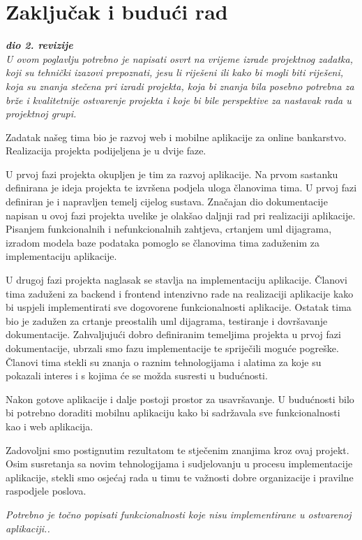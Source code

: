 \chapter{Zaključak i budući rad}
		
		\textbf{\textit{dio 2. revizije}}\\
		
		 \textit{U ovom poglavlju potrebno je napisati osvrt na vrijeme izrade projektnog zadatka, koji su tehnički izazovi prepoznati, jesu li riješeni ili kako bi mogli biti riješeni, koja su znanja stečena pri izradi projekta, koja bi znanja bila posebno potrebna za brže i kvalitetnije ostvarenje projekta i koje bi bile perspektive za nastavak rada u projektnoj grupi.}
		 
		 Zadatak našeg tima bio je razvoj web i mobilne aplikacije za online bankarstvo. Realizacija projekta podijeljena je u dvije faze.
		 
		 U prvoj fazi projekta okupljen je tim za razvoj aplikacije. Na prvom sastanku definirana je ideja projekta te izvršena podjela uloga članovima tima. 
		 U prvoj fazi definiran je i napravljen temelj cijelog sustava. Značajan dio dokumentacije napisan u ovoj fazi projekta uvelike je olakšao daljnji rad pri realizaciji aplikacije. Pisanjem funkcionalnih i nefunkcionalnih zahtjeva, crtanjem uml dijagrama, izradom modela baze podataka pomoglo se članovima tima zaduženim za implementaciju aplikacije.
		 
		 U drugoj fazi projekta naglasak se stavlja na implementaciju aplikacije. Članovi tima zaduženi za backend i frontend intenzivno rade na realizaciji aplikacije kako bi uspjeli implementirati sve dogovorene funkcionalnosti aplikacije. Ostatak tima bio je zadužen za crtanje preostalih uml dijagrama, testiranje i dovršavanje dokumentacije. Zahvaljujući dobro definiranim temeljima projekta u prvoj fazi dokumentacije, ubrzali smo fazu implementacije te spriječili moguće pogreške. Članovi tima stekli su znanja o raznim tehnologijama i alatima za koje su pokazali interes i s kojima će se možda susresti u budućnosti.
		 
		 Nakon gotove aplikacije i dalje postoji prostor za usavršavanje. U budućnosti bilo bi potrebno doraditi mobilnu aplikaciju kako bi sadržavala sve funkcionalnosti kao i web aplikacija.
		 
		 Zadovoljni smo postignutim rezultatom te stječenim znanjima kroz ovaj projekt. Osim susretanja sa novim tehnologijama i sudjelovanju u procesu implementacije aplikacije, stekli smo osjećaj rada u timu te važnosti dobre organizacije i pravilne raspodjele poslova.
		 
		  
		 \textit{Potrebno je točno popisati funkcionalnosti koje nisu implementirane u ostvarenoj aplikaciji..}
		
		\eject 